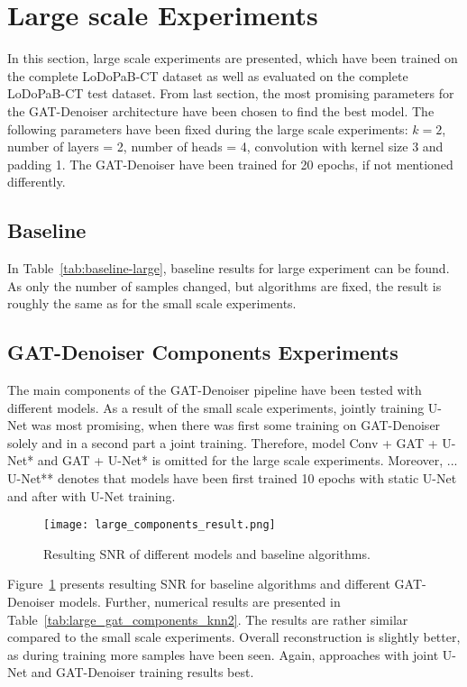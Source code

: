 \section{Large scale Experiments}

In this section, large scale experiments are presented, which have been trained on the complete LoDoPaB-CT dataset
as well as evaluated on the complete LoDoPaB-CT test dataset.
From last section, the most promising parameters for the GAT-Denoiser architecture have been chosen
to find the best model. The following parameters have been fixed during the large scale experiments:
$k=2$, number of layers = 2, number of heads = 4, convolution with kernel size 3 and padding 1.
The GAT-Denoiser have been trained for 20 epochs, if not mentioned differently.


\subsection{Baseline}
In Table~\ref{tab:baseline-large}, baseline results for large experiment can be found.
As only the number of samples changed, but algorithms are fixed, the result is roughly 
the same as for the small scale experiments.

\subsection{GAT-Denoiser Components Experiments}
The main components of the GAT-Denoiser pipeline have been tested with different models.
As a result of the small scale experiments, jointly training U-Net was most promising, 
when there was first some training on GAT-Denoiser solely and in a second part a joint training.
Therefore, model {Conv + GAT + U-Net*} and {GAT + U-Net*} is omitted for the large scale experiments.
Moreover, {... U-Net**} denotes that models have been first trained 10 epochs with
static U-Net and after with U-Net training.


\begin{figure}[H]
  \centering
  \texttt{[image: large\_components\_result.png]}
  \caption{Resulting SNR of different models and baseline algorithms.}
  \label{fig:large_components}
\end{figure}

Figure~\ref{fig:large_components} presents resulting SNR for baseline algorithms and 
different GAT-Denoiser models. Further, numerical results are presented in Table~\ref{tab:large_gat_components_knn2}.
The results are rather similar compared to the small scale experiments.
Overall reconstruction is slightly better, as during training more samples have been seen.
Again, approaches with joint U-Net and GAT-Denoiser training results best.

